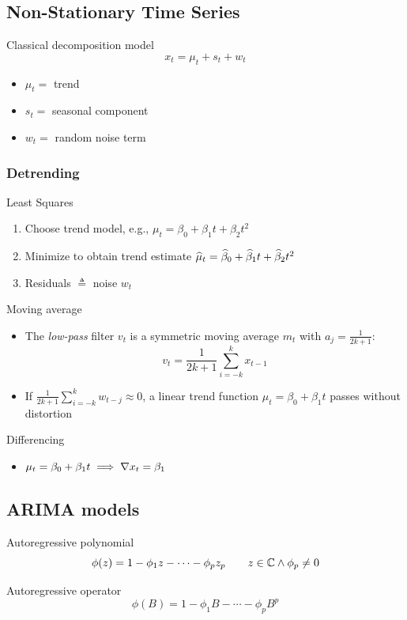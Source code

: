 \documentclass[landscape]{article}
\begin{document}
\begin{multicols*}{2}
\subsection{Non-Stationary Time Series}

Classical decomposition model
$$x_t = \mu_t + s_t + w_t$$
\begin{itemize}
  \item $\mu_t =$ trend
  \item $s_t =$ seasonal component
  \item $w_t =$ random noise term
\end{itemize}

\subsubsection{Detrending}

Least Squares
\begin{enumerate}
  \item Choose trend model, e.g., $\mu_t = \beta_0 + \beta_1 t + \beta_2 t^2$
  \item Minimize \rss to obtain trend estimate 
    $\widehat{\mu}_t = \widehat{\beta}_0 + \widehat{\beta}_1 t + \widehat{\beta}_2 t^2$
  \item Residuals $\triangleq$ noise $w_t$
\end{enumerate}

Moving average
\begin{itemize}
  \item The \emph{low-pass} filter $v_t$ is a symmetric moving average $m_t$
    with $a_j = \frac{1}{2k+1}$:
    $$v_t = \frac{1}{2k+1} \sum_{i=-k}^k x_{t-1}$$
  \item If $\frac{1}{2k+1} \sum_{i=-k}^k w_{t-j} \approx 0$, a linear trend
    function $\mu_t = \beta_0 + \beta_1t$ passes without distortion
\end{itemize}

Differencing
\begin{itemize}
  \item $\mu_t = \beta_0 + \beta_1t \;\Longrightarrow\; \nabla x_t = \beta_1$
\end{itemize}

\subsection{ARIMA models}

Autoregressive polynomial
$$\phi(z) = 1 - \phi_1 z - \cdots - \phi_p z_p 
\qquad z \in \mathbb{C} \wedge \phi_p \neq 0$$

Autoregressive operator
$$\phi(B) = 1 - \phi_1B - \cdots - \phi_pB^p$$


\end{multicols*}
\end{document}
